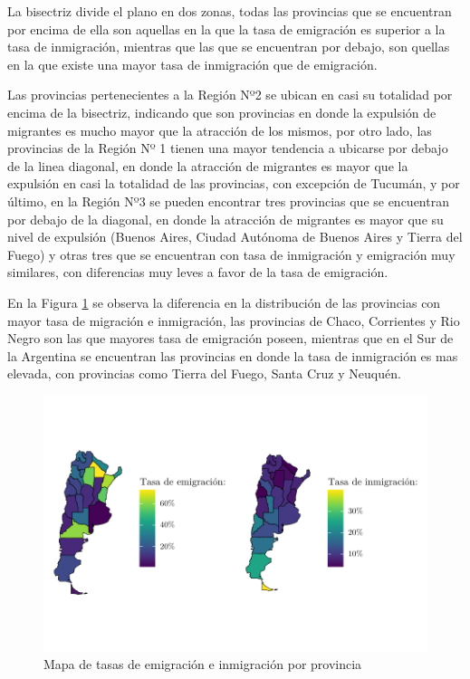 \documentclass[12pt,a4paper]{article}
\begin{document}
La bisectriz divide el plano en dos zonas, todas las provincias que se encuentran por encima de ella son aquellas en la que la tasa de emigración es superior a la tasa de inmigración, mientras que las que se encuentran por debajo, son quellas en la que existe una mayor tasa de inmigración que de emigración. 

Las provincias pertenecientes a la Región Nº2 se ubican en casi su totalidad por encima de la bisectriz, indicando que son provincias en donde la expulsión de migrantes es mucho mayor que la atracción de los mismos, por otro lado, las provincias de la Región Nº 1 tienen una mayor tendencia a ubicarse por debajo de la linea diagonal, en donde la atracción de migrantes es mayor que la expulsión en casi la totalidad de las provincias, con excepción de Tucumán, y por último, en la Región Nº3 se pueden encontrar tres provincias que se encuentran por debajo de la diagonal, en donde la atracción de migrantes es mayor que su nivel de expulsión (Buenos Aires, Ciudad Autónoma de Buenos Aires y Tierra del Fuego) y otras tres que se encuentran con tasa de inmigración y emigración muy similares, con diferencias muy leves a favor de la tasa de emigración.

En la Figura \ref{figure:emig_inmig_prov_mapa} se observa la diferencia en la distribución de las provincias con mayor tasa de migración e inmigración, las provincias de Chaco, Corrientes y Rio Negro son las que mayores tasa de emigración poseen, mientras que en el Sur de la Argentina se encuentran las provincias en donde la tasa de inmigración es mas elevada, con provincias como Tierra del Fuego, Santa Cruz y Neuquén.
\begin{figure}[h!]
\begin{center}
\includegraphics[scale=1.1]{./graficos/emig_inmig_por_prov.pdf}
\caption{Mapa de tasas de emigración e inmigración por provincia}
\label{figure:emig_inmig_prov_mapa}
\end{center}
\end{figure}
\newpage
\end{document}
